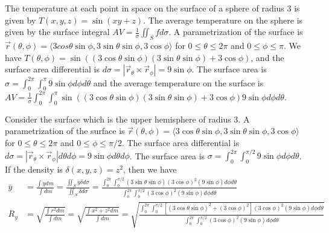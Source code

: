 \begin{example}
  The temperature at each point in space on the surface of a sphere of
  radius 3 is given by {$T(x,y,z) = \sin(xy+z)$}. The average
  temperature on the sphere is given by the surface integral $AV =
  \frac{1}{\sigma}\iint_S fd\sigma$. A parametrization of the surface
  is {$\vec r (\theta,\phi) =
    \langle3cos\theta\sin\phi,3\sin\theta\sin\phi,3\cos\phi\rangle$}
  for {$0\leq \theta\leq 2\pi$} and {$0\leq \phi\leq \pi$}. We have
  {$T(\theta,\phi) =
    \sin((3\cos\theta\sin\phi)(3\sin\theta\sin\phi)+3\cos\phi)$}, and
  the surface area differential is {$d\sigma = |\vec
    r_\theta\times\vec r_\phi| = 9\sin \phi$}. The surface area is
  $\sigma = \int_{0}^{2\pi} \int_{0}^{\pi} 9\sin \phi d\phi d\theta$
  and the average temperature on the surface is $AV =\frac{1}{\sigma}
  \int_{0}^{2\pi} \int_{0}^{\pi}
  \sin((3\cos\theta\sin\phi)(3\sin\theta\sin\phi)+3\cos\phi) 9\sin
  \phi d\phi d\theta $.
\end{example}

\begin{example}
  Consider the surface which is the upper hemisphere of radius 3.  A
  parametrization of the surface is {$\vec r (\theta,\phi) =
    \langle3\cos\theta\sin\phi,3\sin\theta\sin\phi,3\cos\phi\rangle$}
  for {$0\leq \theta\leq 2\pi$} and {$0\leq \phi\leq \pi/2$}. The
  surface area differential is {$d\sigma = |\vec r_\theta\times\vec
    r_\phi|d\theta d\phi = 9\sin \phi d\theta d\phi$}. The surface
  area is $\sigma = \int_{0}^{2\pi} \int_{0}^{\pi/2} 9\sin \phi d\phi
  d\theta$. If the density is $\delta(x,y,z) = z^2$, then we have
  \begin{align*}
    \bar y &= \frac{\int y dm}{\int dm}= \frac{\iint_S y \delta
      d\sigma}{\iint_S \delta d\sigma} = \frac {\int_{0}^{2\pi}
      \int_{0}^{\pi/2} (3\sin\theta\sin\phi)(3\cos\phi)^2(9\sin \phi)
      d\phi d\theta}
    {\int_{0}^{2\pi} \int_{0}^{\pi/2} (3\cos\phi)^2(9\sin \phi) d\phi d\theta}\\
    R_y &= \sqrt{\frac{\int r^2 dm}{\int dm}} =\sqrt{\frac{\int
        x^2+z^2 dm}{\int dm}} = \sqrt{\frac {\int_{0}^{2\pi}
        \int_{0}^{\pi/2}[(3\cos\theta\sin\phi)^2+(3\cos\phi)^2]
        (3\cos\phi)^2(9\sin \phi) d\phi d\theta} {\int_{0}^{2\pi}
        \int_{0}^{\pi/2} (3\cos\phi)^2(9\sin \phi) d\phi d\theta}}
  \end{align*}
\end{example}




